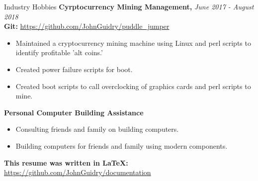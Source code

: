 \documentclass{resume} %
\begin{document}

\begin{rSection}{Industry Hobbies} 
{\bf Cyrptocurrency Mining Management, }{\em June 2017 - August 2018} 
\\
{\bf Git: }\url {https://github.com/JohnGuidry/puddle_jumper}
\begin{itemize}
\item Maintained a cryptocurrency mining machine using Linux and perl scripts to identify profitable 'alt coins.'
\item Created power failure scripts for boot.
\item Created boot scripts to call overclocking of graphics cards and perl scripts to mine.
\end{itemize}

{\bf Personal Computer Building Assistance}
\begin{itemize}
\item Consulting friends and family on building computers.
\item Building computers for friends and family using modern components.
\end{itemize}

{\bf This resume was written in LaTeX: }\url{https://github.com/JohnGuidry/documentation}
\end{rSection}
\end{document}

